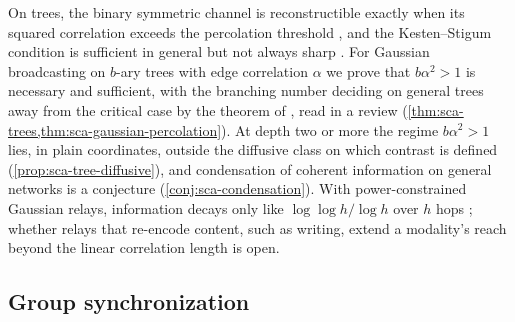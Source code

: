 On trees, the binary symmetric channel is reconstructible exactly when its squared correlation exceeds the percolation threshold \citep{bleher1995purity,evans2000broadcasting}, and the Kesten--Stigum condition \citep{kesten1966additional} is sufficient in general but not always sharp \citep{mossel2001reconstruction}. For Gaussian broadcasting on $b$-ary trees with edge correlation $\alpha$ we prove that $b\alpha^2>1$ is necessary and sufficient, with the branching number deciding on general trees away from the critical case by the theorem of \citet{lyons1990random}, read in a review (\cref{thm:sca-trees,thm:sca-gaussian-percolation}). At depth two or more the regime $b\alpha^2>1$ lies, in plain coordinates, outside the diffusive class on which contrast is defined (\cref{prop:sca-tree-diffusive}), and condensation of coherent information on general networks is a conjecture (\cref{conj:sca-condensation}). With power-constrained Gaussian relays, information decays only like $\log\log h/\log h$ over $h$ hops \citep{polyanskiy2016dissipation}; whether relays that re-encode content, such as writing, extend a modality's reach beyond the linear correlation length is open.

\subsection{Group synchronization}\label{sec:rel-sync}

